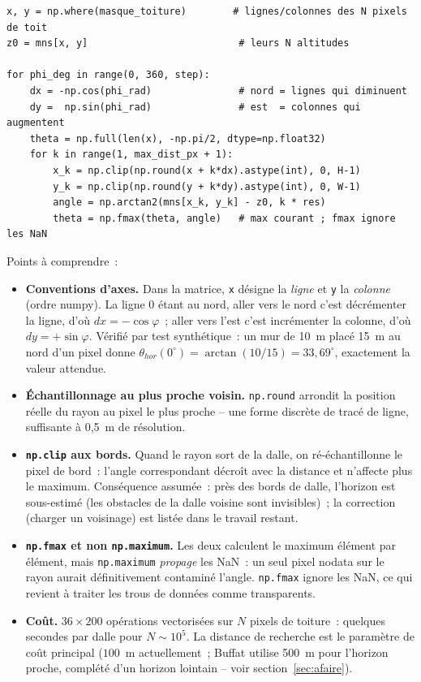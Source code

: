 \documentclass[11pt,a4paper]{article}
\newcommand{\fonction}[1]{\texttt{#1}}
\begin{document}
\begin{lstlisting}
x, y = np.where(masque_toiture)        # lignes/colonnes des N pixels de toit
z0 = mns[x, y]                          # leurs N altitudes

for phi_deg in range(0, 360, step):
    dx = -np.cos(phi_rad)               # nord = lignes qui diminuent
    dy =  np.sin(phi_rad)               # est  = colonnes qui augmentent
    theta = np.full(len(x), -np.pi/2, dtype=np.float32)
    for k in range(1, max_dist_px + 1):
        x_k = np.clip(np.round(x + k*dx).astype(int), 0, H-1)
        y_k = np.clip(np.round(y + k*dy).astype(int), 0, W-1)
        angle = np.arctan2(mns[x_k, y_k] - z0, k * res)
        theta = np.fmax(theta, angle)   # max courant ; fmax ignore les NaN
\end{lstlisting}

Points à comprendre~:
\begin{itemize}
  \item \textbf{Conventions d'axes.} Dans la matrice, \fonction{x} désigne la
    \emph{ligne} et \fonction{y} la \emph{colonne} (ordre numpy). La ligne 0
    étant au nord, aller vers le nord c'est décrémenter la ligne, d'où
    $dx = -\cos\varphi$~; aller vers l'est c'est incrémenter la colonne, d'où
    $dy = +\sin\varphi$. Vérifié par test synthétique~: un mur de 10~m placé
    15~m au nord d'un pixel donne $\theta_{hor}(0^\circ) =
    \arctan(10/15) = 33{,}69^\circ$, exactement la valeur attendue.
  \item \textbf{Échantillonnage au plus proche voisin.} \fonction{np.round}
    arrondit la position réelle du rayon au pixel le plus proche -- une forme
    discrète de tracé de ligne, suffisante à 0,5~m de résolution.
  \item \textbf{\fonction{np.clip} aux bords.} Quand le rayon sort de la dalle,
    on ré-échantillonne le pixel de bord~: l'angle correspondant décroît avec la
    distance et n'affecte plus le maximum. Conséquence assumée~: près des bords
    de dalle, l'horizon est sous-estimé (les obstacles de la dalle voisine sont
    invisibles)~; la correction (charger un voisinage) est listée dans le
    travail restant.
  \item \textbf{\fonction{np.fmax} et non \fonction{np.maximum}.} Les deux
    calculent le maximum élément par élément, mais \fonction{np.maximum}
    \emph{propage} les NaN~: un seul pixel nodata sur le rayon aurait
    définitivement contaminé l'angle. \fonction{np.fmax} ignore les NaN, ce qui
    revient à traiter les trous de données comme transparents.
  \item \textbf{Coût.} $36 \times 200$ opérations vectorisées sur $N$ pixels de
    toiture~: quelques secondes par dalle pour $N \sim 10^5$. La distance de
    recherche est le paramètre de coût principal ($100$~m actuellement~;
    Buffat utilise 500~m pour l'horizon proche, complété d'un horizon lointain
    -- voir section~\ref{sec:afaire}).
\end{itemize}
\end{document}
